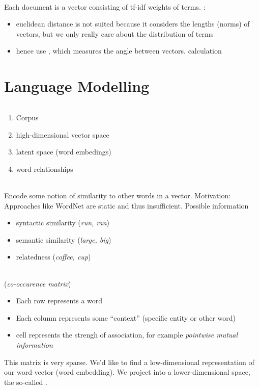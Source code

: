 \documentclass[10pt,twocolumn]{article}
\begin{document}
\paragraph{} Each document is a vector consisting of
tf-idf weights of terms. :
\begin{itemize}
\item euclidean distance is not suited because it considers the lengths (norms)
  of vectors, but we only really care about the distribution of terms
\item hence use , which measures the angle between
  vectors. \todo calculation
\end{itemize}


\pagebreak
\part{Language Modelling}

\paragraph{}
\begin{enumerate}
\item Corpus
\item high-dimensional vector space
\item latent space (word embedings)
\item word relationships
\end{enumerate}


\paragraph{} Encode some notion of similarity to other words
in a vector. Motivation: Approaches like WordNet are static and thus
insufficient. Possible information
\begin{itemize}
\item syntactic similarity (\textit{run, ran})
\item semantic similarity (\textit{large, big})
\item relatedness (\textit{coffee, cup})
\end{itemize}

\paragraph{} (\textit{co-occurence matrix})
\begin{itemize}
\item Each row represents a word
\item Each column represents some ``context'' (specific entity or other word)
\item cell represents the strengh of association, for example \textit{pointwise
    mutual information}
\end{itemize}
This matrix is very sparse. We'd like to find a low-dimensional
representation of our word vector (word embedding). We project into a
lower-dimensional space, the so-called .
\end{document}
